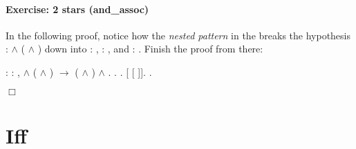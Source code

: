 \documentclass[12pt]{report}
\begin{document}
\paragraph{Exercise: 2 stars (and\_assoc)}

 In the following proof, notice how the \textit{nested pattern} in the
     breaks the hypothesis  :  \ensuremath{\land} ( \ensuremath{\land} ) down into
    : ,  : , and  : .  Finish the proof from there: \begin{coqdoccode}
\coqdocemptyline
\coqdocnoindent
{}  : \coqdockw{\ensuremath{\forall}}    : , \coqdoceol
\coqdocindent{1.00em}
 \ensuremath{\land} ( \ensuremath{\land} ) \ensuremath{\rightarrow} ( \ensuremath{\land} ) \ensuremath{\land} .\coqdoceol
\coqdocnoindent
{}.\coqdoceol
\coqdocindent{1.00em}
    .\coqdoceol
\coqdocindent{1.00em}
   [ [ ]].\coqdoceol
 .\coqdoceol
\end{coqdoccode}
\ensuremath{\Box} \begin{coqdoccode}
\coqdocemptyline
\end{coqdoccode}
\section{Iff}
\end{document}
